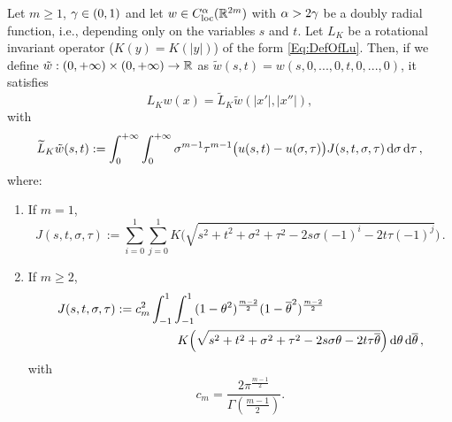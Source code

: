 \begin{lemma}
\label{Lemma:OperatorInSTVariables} Let $m \geq 1$, $\gamma\in(0,1)$ and let $w\in
C_{\mathrm{loc}}^\alpha(\mathbb{R}^{2m})$ with $\alpha > 2\gamma$ be a doubly radial function, i.e., depending only on
the variables $s$ and $t$. Let $L_K$ be a rotational invariant operator ($K(y) = K(|y|)$) of the form
\eqref{Eq:DefOfLu}. Then, if we define $\tilde{w}:(0,+\infty)\times (0,+\infty) \to \mathbb{R}$ as
$\tilde{w}(s,t) = w(s,0,...,0,t,0,...,0)$, it satisfies
$$ L_Kw(x) = \tilde{L}_K \tilde{w} (|x'|,|x''|), $$
with
\begin{equation*}
\label{Eq:OperatorInSTVariables}
\widetilde{L}_K \tilde{w} (s,t) := \int_0^{+\infty}  \int_0^{+\infty} \sigma^{m-1} \tau^{m-1} \big(u(s,t) - u(\sigma, \tau)\big) J(s,t,\sigma, \tau)  \,\mathrm{d} \sigma\,\mathrm{d} \tau\,,
\end{equation*}
where:
\begin{enumerate}
	\item If $m= 1$,
	\begin{equation}
		\label{Eq:KernelInSTVariablesR2}
	J(s,t,\sigma, \tau) := \sum_{i=0}^1  \sum_{j =0}^1  K\Big(\sqrt{s^2 + t^2 + \sigma^2 + \tau^2 -2 s \sigma (-1)^i -2 t \tau (-1)^j}\Big)\,.
	\end{equation}
	
	\item If $m\geq 2$,
	\begin{align}
	J(s,t,\sigma, \tau) &:= c_m ^2  \int_{-1}^1  \int_{-1}^1  (1-\theta^2)^{\frac{m-2}{2}} (1-\overline{\theta}^2)^{\frac{m-2}{2}} \nonumber\\
	& \quad \quad \quad \quad \quad
	K\Big(\sqrt{s^2 + t^2 + \sigma^2 + \tau^2 -2 s \sigma \theta -2 t \tau \overline{\theta}}\Big) \,\mathrm{d} \theta \,\mathrm{d} \overline{\theta}\,, \label{Eq:KernelSTVariables2}
	\end{align}
	with
	$$
	c_m = \dfrac{2 \pi^{\frac{m-1}{2}}}{\Gamma (\frac{m-1}{2})}.
	$$
\end{enumerate}
\end{lemma}


